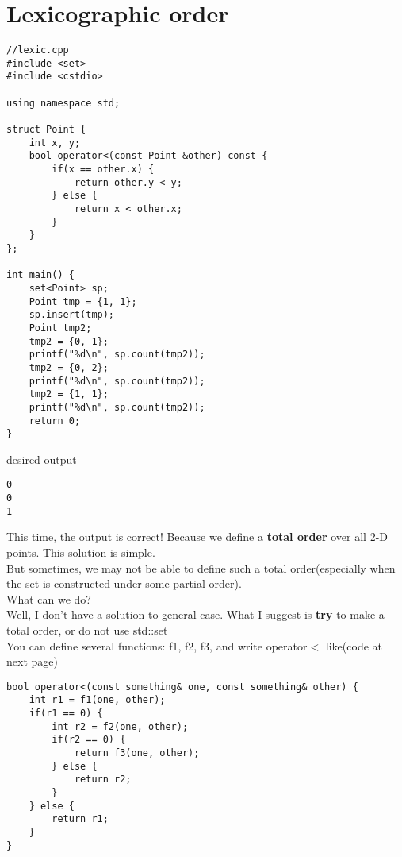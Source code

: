 \documentclass{article}
\begin{document}
\section{Lexicographic order}
\begin{lstlisting}
//lexic.cpp
#include <set>
#include <cstdio>

using namespace std;

struct Point {
    int x, y;
    bool operator<(const Point &other) const {
        if(x == other.x) {
            return other.y < y;
        } else {
            return x < other.x;
        }
    }
};

int main() {
    set<Point> sp;
    Point tmp = {1, 1};
    sp.insert(tmp);
    Point tmp2;
    tmp2 = {0, 1};
    printf("%d\n", sp.count(tmp2));
    tmp2 = {0, 2};
    printf("%d\n", sp.count(tmp2));
    tmp2 = {1, 1};
    printf("%d\n", sp.count(tmp2));
    return 0;
}
\end{lstlisting}
desired output
\begin{lstlisting}
0
0
1
\end{lstlisting}
This time, the output is correct! Because we define a \textbf{total order} over all 2-D points. This solution is simple.\\
But sometimes, we may not be able to define such a total order(especially when the set is constructed under some partial order).\\
What can we do?\\
Well, I don't have a solution to general case. What I suggest is \textbf{try} to make a total order, or do not use std::set\\
You can define several functions: f1, f2, f3, and write operator$<$ like(code at next page)
\newpage
\begin{lstlisting}
bool operator<(const something& one, const something& other) {
    int r1 = f1(one, other);
    if(r1 == 0) {
        int r2 = f2(one, other);
        if(r2 == 0) {
            return f3(one, other);
        } else {
            return r2;
        }
    } else {
        return r1;
    }
}
\end{lstlisting}
\newpage
\end{document}

